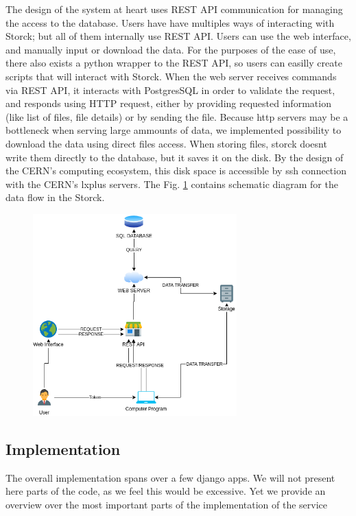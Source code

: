 The design of the system at heart uses REST API communication for managing the access to the database.
Users have have multiples ways of interacting with Storck; but all of them internally use REST API.
Users can use the web interface, and manually input or download the data.
For the purposes of the ease of use, there also exists a python wrapper to the REST API, so users can easilly create scripts that will interact with Storck.
When the web server receives commands via REST API, it interacts with PostgresSQL in order to validate the request, and responds using HTTP request, either by providing requested information (like list of files, file details) or by sending the file.
Because http servers may be a bottleneck when serving large ammounts of data, we implemented possibility to download the data using direct files access.
When storing files, storck doesnt write them directly to the database, but it saves it on the disk.
By the design of the CERN's computing ecosystem, this disk space is accessible by ssh connection with the CERN's lxplus servers.
The Fig. \ref{fig:storck_diagram} contains schematic diagram for the data flow in the Storck.


\begin{figure}[H]
\centering
\includegraphics[width=0.7\textwidth]{figures/chapter5/storck/storck diagram.drawio.png}
\caption{
}
\label{fig:storck_diagram}
\end{figure}

\subsection{Implementation}

The overall implementation spans over a few django apps. We will not present here parts of the code, as we feel this would be excessive.
Yet we provide an overview over the most important parts of the implementation of the service

